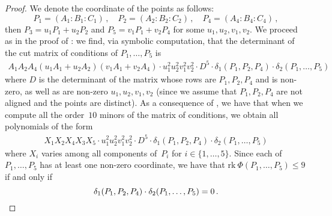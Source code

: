 \documentclass{amsart}
\theoremstyle{plain}
\theoremstyle{definition}
\newcommand{\rk}{\ensuremath{\mathrm{rk}}}
\begin{document}
\begin{proof}
We denote the coordinate of the points as follows:
%
\[
 P_1 = (A_1: B_1: C_1) \,, \quad
 P_2 = (A_2: B_2: C_2) \,, \quad
 P_4 = (A_4: B_4: C_4) \,,
\]
%
then $P_3 = u_1P_1+u_2P_2$ and $P_5 = v_1P_1+v_2P_4$ for some $u_1, u_2, v_1, v_2$.
We proceed as in
the proof of : we find, via symbolic computation, that the determinant of
the cut matrix of conditions of $P_1, \dotsc, P_5$ is
%
\begin{gather}
\label{delta1delta2}
A_1A_2A_4(u_1A_1+u_2A_2)(v_1A_1+v_2A_4) \cdot u_1^2u_2^2v_1^2v_2^2 \cdot D^5 \cdot
\delta_1(P_1,P_2,P_4) \cdot \delta_2(P_1,\dots,P_5)
\end{gather}
%
where $D$ is the determinant of the matrix whose rows are $P_1, P_2, P_4$
and is non-zero, as well as are non-zero $u_1, u_2, v_1, v_2$ (since we
assume that $P_1, P_2, P_4$ are not aligned and the points are distinct).
As a consequence of , we have that when we compute all the order~$10$ minors of the matrix of conditions, we obtain all polynomials of the form
%
\begin{gather*}
X_1X_2X_4 X_3 X_5 \cdot u_1^2u_2^2v_1^2v_2^2 \cdot D^5 \cdot
\delta_1(P_1,P_2,P_4) \cdot \delta_2(P_1,\dots,P_5)
\end{gather*}
%
where $X_i$ varies among all components of~$P_i$ for $i \in \{1, \dotsc, 5\}$.
Since each of $P_1, \dotsc, P_5$ has at least one non-zero coordinate, we have that
$\rk \ \Phi(P_1, \dots, P_5) \leq 9$ if and only if
\[
\delta_1(P_1, P_2, P_4) \cdot \delta_2(P_1, \dots, P_5) = 0 \,. \qedhere
\]
\end{proof}
\end{document}
